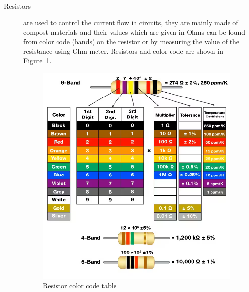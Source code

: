 \documentclass[a4paper, 10pt]{article}
\newcommand{\figref}[1]{Figure~\ref{#1}}
\begin{document}
\begin{description}
				\pagebreak
				\item[Resistors] are used to control the current flow in circuits, they are mainly made of compost materials and their values which are given in Ohms can be found from color code (bands) on the resistor or by measuring the value of the resistance using Ohm-meter.
					Resistors and color code are shown in \figref{fig:ResistorColorCode}.
					\begin{figure}[h!]
						\centering
						\includegraphics[width=\textwidth]{images/ResistorColorCode.png}
						\caption{Resistor color code table}
						\label{fig:ResistorColorCode}
					\end{figure}
			\end{description}
	
	\pagebreak
\end{document}
